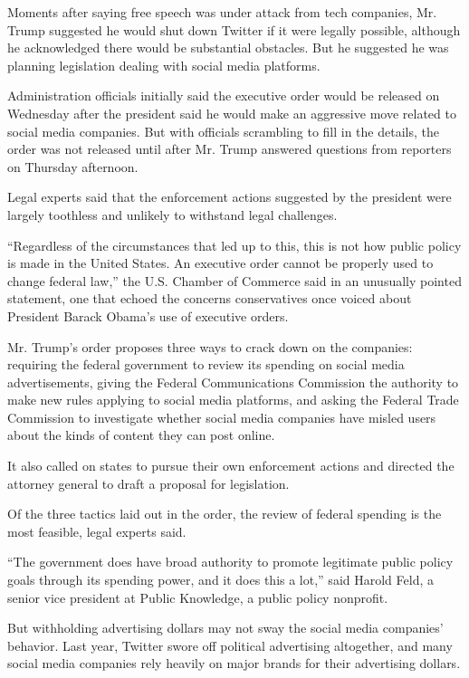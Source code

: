 Moments after saying free speech was under attack from tech companies,
Mr. Trump suggested he would shut down Twitter if it were legally
possible, although he acknowledged there would be substantial obstacles.
But he suggested he was planning legislation dealing with social media
platforms.

Administration officials initially said the executive order would be
released on Wednesday after the president said he would make an
aggressive move related to social media companies. But with officials
scrambling to fill in the details, the order was not released until
after Mr. Trump answered questions from reporters on Thursday afternoon.

Legal experts said that the enforcement actions suggested by the
president were largely toothless and unlikely to withstand legal
challenges.

``Regardless of the circumstances that led up to this, this is not how
public policy is made in the United States. An executive order cannot be
properly used to change federal law,'' the U.S. Chamber of Commerce said
in an unusually pointed statement, one that echoed the concerns
conservatives once voiced about President Barack Obama's use of
executive orders.

Mr. Trump's order proposes three ways to crack down on the companies:
requiring the federal government to review its spending on social media
advertisements, giving the Federal Communications Commission the
authority to make new rules applying to social media platforms, and
asking the Federal Trade Commission to investigate whether social media
companies have misled users about the kinds of content they can post
online.

It also called on states to pursue their own enforcement actions and
directed the attorney general to draft a proposal for legislation.

Of the three tactics laid out in the order, the review of federal
spending is the most feasible, legal experts said.

``The government does have broad authority to promote legitimate public
policy goals through its spending power, and it does this a lot,'' said
Harold Feld, a senior vice president at Public Knowledge, a public
policy nonprofit.

But withholding advertising dollars may not sway the social media
companies' behavior. Last year, Twitter swore off political advertising
altogether, and many social media companies rely heavily on major brands
for their advertising dollars.

